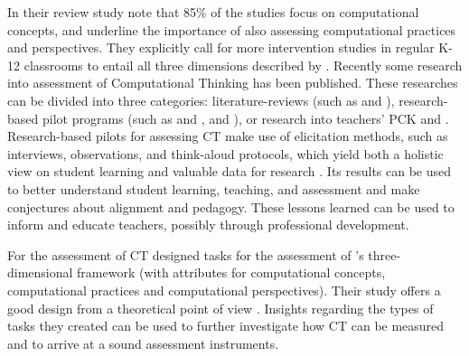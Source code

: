 In their review study  note that 85\% of the studies focus on computational concepts, and underline the importance of also assessing computational practices and perspectives. They explicitly call for more intervention studies in regular K-12 classrooms to entail all three dimensions described by . Recently some research into assessment of Computational Thinking has been published. These researches can be divided into three categories: literature-reviews (such as  and ), research-based pilot programs (such as  and , and ), or research into teachers' PCK  and . Research-based pilots for assessing CT make use of elicitation methods, such as interviews, observations, and think-aloud protocols, which yield both a holistic view on student learning and valuable data for research \cite{grover2017measuring}. Its results can be used to better understand student learning, teaching, and assessment and make conjectures about alignment and pedagogy. These lessons learned can be used to inform and educate teachers, possibly through professional development.




For the assessment of CT  designed tasks for the assessment of 's three-dimensional framework (with attributes for computational concepts, computational practices and computational perspectives). Their study offers a good design from a theoretical point of view \cite{voogt2017effecten}. Insights regarding the types of tasks they created can be used to further investigate how CT can be measured and to arrive at a sound assessment instruments.





